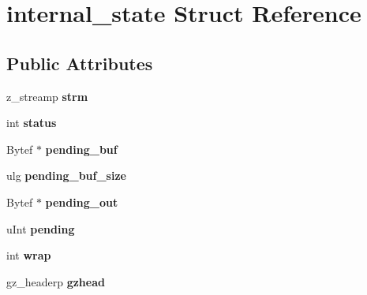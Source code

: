 \hypertarget{structinternal__state}{}\section{internal\+\_\+state Struct Reference}
\label{structinternal__state}
\subsection*{Public Attributes}
\begin{DoxyCompactItemize}
\item 
z\+\_\+streamp {\bfseries strm}\hypertarget{structinternal__state_aaf558a49ab8c6caea3d131c6b913db42}{}\label{structinternal__state_aaf558a49ab8c6caea3d131c6b913db42}

\item 
int {\bfseries status}\hypertarget{structinternal__state_a8756cacdbac452a2633f87e06fae6c52}{}\label{structinternal__state_a8756cacdbac452a2633f87e06fae6c52}

\item 
Bytef $\ast$ {\bfseries pending\+\_\+buf}\hypertarget{structinternal__state_ae5f393e8d0d569da6038749768f65b94}{}\label{structinternal__state_ae5f393e8d0d569da6038749768f65b94}

\item 
ulg {\bfseries pending\+\_\+buf\+\_\+size}\hypertarget{structinternal__state_a9100ecccf2f8bb474f0bcc7c69f55c27}{}\label{structinternal__state_a9100ecccf2f8bb474f0bcc7c69f55c27}

\item 
Bytef $\ast$ {\bfseries pending\+\_\+out}\hypertarget{structinternal__state_a6e15ed78675c3c7bdb312623b5eceb7a}{}\label{structinternal__state_a6e15ed78675c3c7bdb312623b5eceb7a}

\item 
u\+Int {\bfseries pending}\hypertarget{structinternal__state_ac92f5b70c269be4685539daef10b15a3}{}\label{structinternal__state_ac92f5b70c269be4685539daef10b15a3}

\item 
int {\bfseries wrap}\hypertarget{structinternal__state_ae80327ea7ad4ad0ef5baeef5ef3a6807}{}\label{structinternal__state_ae80327ea7ad4ad0ef5baeef5ef3a6807}

\item 
gz\+\_\+headerp {\bfseries gzhead}\hypertarget{structinternal__state_ac023d0c9e6112dfe6cbd049a56484997}{}\label{structinternal__state_ac023d0c9e6112dfe6cbd049a56484997}


\end{DoxyCompactItemize}
